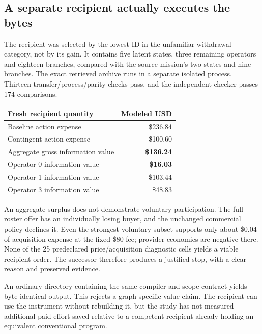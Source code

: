 \documentclass[11pt,letterpaper]{article}
\begin{document}
\hypertarget{a-separate-recipient-actually-executes-the-bytes}{%
\subsection{A separate recipient actually executes the
bytes}\label{a-separate-recipient-actually-executes-the-bytes}}

The recipient was selected by the lowest ID in the unfamiliar withdrawal
category, not by its gain. It contains five latent states, three
remaining operators and eighteen branches, compared with the source
mission's two states and nine branches. The exact retrieved archive runs
in a separate isolated process. Thirteen transfer/process/parity checks
pass, and the independent checker passes 174 comparisons.

\begin{longtable}[]{@{}lr@{}}
\toprule\noalign{}
Fresh recipient quantity & Modeled USD \\
\midrule\noalign{}
\endhead
\bottomrule\noalign{}
\endlastfoot
Baseline action expense & \$236.84 \\
Contingent action expense & \$100.60 \\
Aggregate gross information value & \textbf{\$136.24} \\
Operator 0 information value & \textbf{−\$16.03} \\
Operator 1 information value & \$103.44 \\
Operator 3 information value & \$48.83 \\
\end{longtable}

An aggregate surplus does not demonstrate voluntary participation. The
full-roster offer has an individually losing buyer, and the unchanged
commercial policy declines it. Even the strongest voluntary subset
supports only about \$0.04 of acquisition expense at the fixed \$80 fee;
provider economics are negative there. None of the 25 predeclared
price/acquisition diagnostic cells yields a viable recipient order. The
successor therefore produces a justified stop, with a clear reason and
preserved evidence.

An ordinary directory containing the same compiler and scope contract
yields byte-identical output. This rejects a graph-specific value claim.
The recipient can use the instrument without rebuilding it, but the
study has not measured additional paid effort saved relative to a
competent recipient already holding an equivalent conventional program.
\end{document}
